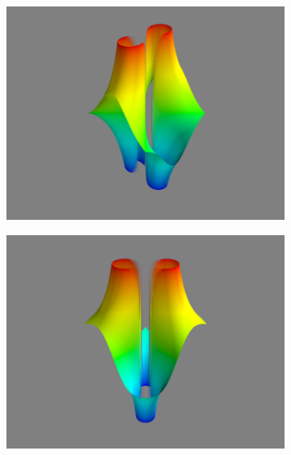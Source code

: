 \begin{figure}
\begin{subfigure}{.32\textwidth}
\includegraphics[width=\textwidth]{inv2_real_surface.png}
\end{subfigure}
\begin{subfigure}{.32\textwidth}
\includegraphics[width=\textwidth]{inv2_imag_surface.png}
\end{subfigure}
\begin{subfigure}{.32\textwidth}

\end{subfigure}
\end{figure}
